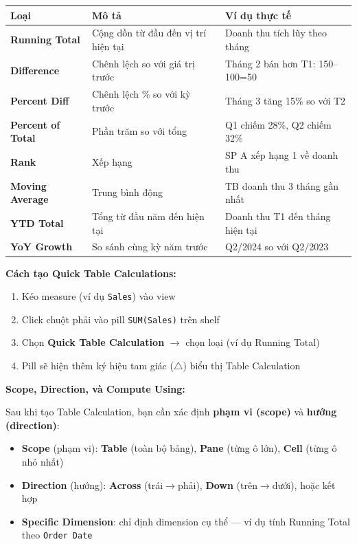 \documentclass[12pt]{article}
\begin{document}
\begin{center}
\renewcommand{\arraystretch}{1.4}
\small
\begin{tabularx}{\linewidth}{l X X}
\toprule
\textbf{Loại} & \textbf{Mô tả} & \textbf{Ví dụ thực tế} \\
\midrule
\textbf{Running Total} & Cộng dồn từ đầu đến vị trí hiện tại & Doanh thu tích lũy theo tháng \\
\textbf{Difference} & Chênh lệch so với giá trị trước & Tháng 2 bán hơn T1: 150--100=50 \\
\textbf{Percent Diff} & Chênh lệch \% so với kỳ trước & Tháng 3 tăng 15\% so với T2 \\
\textbf{Percent of Total} & Phần trăm so với tổng & Q1 chiếm 28\%, Q2 chiếm 32\% \\
\textbf{Rank} & Xếp hạng & SP A xếp hạng 1 về doanh thu \\
\textbf{Moving Average} & Trung bình động & TB doanh thu 3 tháng gần nhất \\
\textbf{YTD Total} & Tổng từ đầu năm đến hiện tại & Doanh thu T1 đến tháng hiện tại \\
\textbf{YoY Growth} & So sánh cùng kỳ năm trước & Q2/2024 so với Q2/2023 \\
\bottomrule
\end{tabularx}
\end{center}

\noindent \textbf{Cách tạo Quick Table Calculations:}

\begin{enumerate}[nosep]
    \item Kéo measure (ví dụ \texttt{Sales}) vào view
    \item Click chuột phải vào pill \texttt{SUM(Sales)} trên shelf
    \item Chọn \textbf{Quick Table Calculation} $\rightarrow$ chọn loại (ví dụ Running Total)
    \item Pill sẽ hiện thêm ký hiệu tam giác ($\triangle$) biểu thị Table Calculation
\end{enumerate}

\noindent \textbf{Scope, Direction, và Compute Using:}

\noindent Sau khi tạo Table Calculation, bạn cần xác định \textbf{phạm vi (scope)} và \textbf{hướng (direction)}:

\begin{itemize}[nosep]
    \item \textbf{Scope} (phạm vi): \textbf{Table} (toàn bộ bảng), \textbf{Pane} (từng ô lớn), \textbf{Cell} (từng ô nhỏ nhất)
    \item \textbf{Direction} (hướng): \textbf{Across} (trái$\rightarrow$phải), \textbf{Down} (trên$\rightarrow$dưới), hoặc kết hợp
    \item \textbf{Specific Dimension}: chỉ định dimension cụ thể --- ví dụ tính Running Total theo \texttt{Order Date}
\end{itemize}
\end{document}
